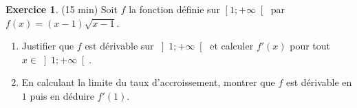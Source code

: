 \documentclass{exam}
\theoremstyle{definition}
\newtheorem{exercice}{Exercice}
\begin{document}

\begin{exercice}{(15 min)}
    Soit $f$ la fonction définie sur $\left[1; +\infty\right[$ par $f(x) = (x-1)\sqrt{x-1}$.
    \begin{enumerate}
        \item Justifier que $f$ est dérivable sur $\left]1; +\infty\right[$ et calculer $f'(x)$ pour tout $x \in \left]1; +\infty\right[$.
        \item En calculant la limite du taux d'accroissement, montrer que $f$ est dérivable en $1$ puis en déduire $f'(1)$.
    \end{enumerate}
    \end{exercice}
    
\end{document}
